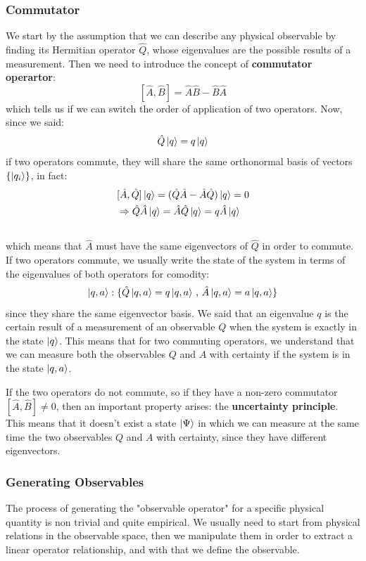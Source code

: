 \documentclass[12pt,a4paper]{article}
\begin{document}
\subsubsection{Commutator}
We start by the assumption that we can describe any physical observable by finding its
Hermitian operator $\hat{Q}$, whose eigenvalues are the possible results of a measurement.
Then we need to introduce the concept of \textbf{commutator operartor}:
$$
[\hat{A}, \hat{B}] = \hat{A}\hat{B} - \hat{B}\hat{A}
$$
which tells us if we can switch the order of application of two operators.
Now, since we said:
$$
\hat{Q} \ket{q} = q \ket{q}
$$
if two operators commute, they will share the same orthonormal basis of vectors
$\{\ket{q_i}\}$, in fact:
\begin{align*}
&[\hat{A}, \hat{Q}] \ket{q} = (\hat{Q}\hat{A} - \hat{A}\hat{Q}) \ket{q} = 0\\
&\Rightarrow \hat{Q}\hat{A} \ket{q} = \hat{A}\hat{Q} \ket{q} = q\hat{A}\ket{q}\\
&
\end{align*}
which means that $\hat{A}$ must have the same eigenvectors of $\hat{Q}$ in order to commute.
If two operators commute, we usually write the state of the system in terms of
the eigenvalues of both operators for comodity:
$$
\ket{q,a} : \{\hat{Q}\ket{q,a} = q \ket{q,a} \, , \, \hat{A}\ket{q,a} = a \ket{q,a}\}
$$
since they share the same eigenvector basis.
We said that an eigenvalue $q$ is the certain result of a measurement of an
observable $Q$ when the system is exactly in the state $\ket{q}$. This means that for
two commuting operators, we understand that we can measure both the observables $Q$
and $A$ with certainty if the system is in the state $\ket{q,a}$.

If the two operators do not commute, so if they have a non-zero commutator
$[\hat{A}, \hat{B}] \neq 0$, then an important property arises:
the \textbf{uncertainty principle}.
This means that it doesn't exist a state $\ket{\Psi}$ in which we can measure at the
same time the two observables $Q$ and $A$ with certainty, since they have different
eigenvectors.

\subsubsection{Generating Observables}
The process of generating the "observable operator" for a specific physical quantity is non trivial and quite empirical.
We usually need to start from physical relations in the observable space, then we manipulate them in order to extract a linear operator relationship, and with that we define the observable.
\end{document}
